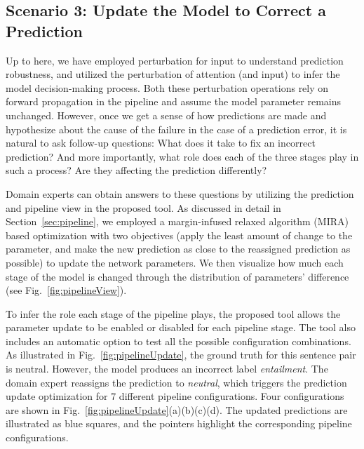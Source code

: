 \subsection{Scenario 3: Update the Model to Correct a Prediction}
Up to here, we have employed perturbation for input to understand prediction robustness, and utilized the perturbation of attention (and input) to infer the model decision-making process. Both these perturbation operations rely on forward propagation in the pipeline and assume the model parameter remains unchanged.
%
However, once we get a sense of how predictions are made and hypothesize about the cause of the failure in the case of a prediction error, it is natural to ask follow-up questions: What does it take to fix an incorrect prediction? And more importantly, what role does each of the three stages play in such a process? Are they affecting the prediction differently?

Domain experts can obtain answers to these questions by utilizing the prediction and pipeline view in the proposed tool. As discussed in detail in Section~\ref{sec:pipeline}, we employed a margin-infused relaxed algorithm (MIRA) based optimization with two objectives (apply the least amount of change to the parameter, and make the new prediction as close to the reassigned prediction as possible) to update the network parameters.
%
We then visualize how much each stage of the model is changed through the distribution of parameters' difference (see Fig.~\ref{fig:pipelineView}).

To infer the role each stage of the pipeline plays, the proposed tool allows the parameter update to be enabled or disabled for each pipeline stage.
The tool also includes an automatic option to test all the possible configuration combinations. As illustrated in Fig.~\ref{fig:pipelineUpdate}, the ground truth for this sentence pair is neutral. However, the model produces an incorrect label \emph{entailment}. The domain expert reassigns the prediction to \emph{neutral}, which triggers the prediction update optimization for $7$ different pipeline configurations. Four configurations are shown in Fig.~\ref{fig:pipelineUpdate}(a)(b)(c)(d). The updated predictions are illustrated as blue squares, and the pointers highlight the corresponding pipeline configurations.

